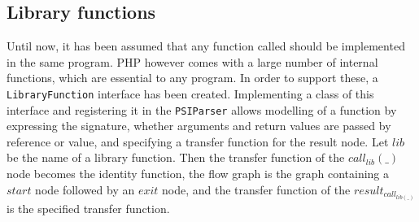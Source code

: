 \subsection{Library functions}

Until now, it has been assumed that any function called should be implemented in the same program. PHP however comes with a large number of internal functions, which are essential to any program. In order to support these, a \texttt{LibraryFunction} interface has been created. Implementing a class of this interface and registering it in the \texttt{PSIParser} allows modelling of a function by expressing the signature, whether arguments and return values are passed by reference or value, and specifying a transfer function for the result node. Let $\mathit{lib}$ be the name of a library function. Then the transfer function of the $\mathit{call}_\mathit{lib}(\_)$ node becomes the identity function, the flow graph is the graph containing a $\mathit{start}$ node followed by an $\mathit{exit}$ node, and the transfer function of the $\mathit{result}_{\mathit{call}_{\mathit{lib}(\_)}}$ is the specified transfer function. 

